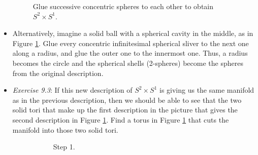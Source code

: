 \documentclass[titlepage]{article}
\numberwithin{figure}{section}
\numberwithin{table}{section}
\numberwithin{equation}{section}
\begin{document}
\begin{itemize}
\begin{figure}[h!]
        \caption{Glue successive concentric spheres to each other to obtain $S^2\times S^1$.}
        \label{fig:s2s1concentric}
    \end{figure}
    \item Alternatively, imagine a solid ball with a spherical cavity in the middle, as in Figure \ref{fig:s2s1concentric}. Glue every concentric infinitesimal spherical sliver to the next one along a radius, and glue the outer one to the innermost one. Thus, a radius becomes the circle and the spherical shells (2-spheres) become the spheres from the original description.
    \item \emph{Exercise 9.3}: If this new description of $S^2\times S^1$ is giving us the same manifold as in the previous description, then we should be able to see that the two solid tori that make up the first description in the picture that gives the second description in Figure \ref{fig:s2s1concentric}. Find a torus in Figure \ref{fig:s2s1concentric} that cuts the manifold into those two solid tori.
    \begin{figure}[h!]
        \centering
        \begin{subfigure}[b]{0.2\linewidth}
            \centering
            \caption{Step 1.}
            \label{fig:ex9-3a}
        \end{subfigure}
        \begin{subfigure}[b]{0.2\linewidth}
            \centering
\end{subfigure}
\end{figure}
\end{itemize}
\end{document}
